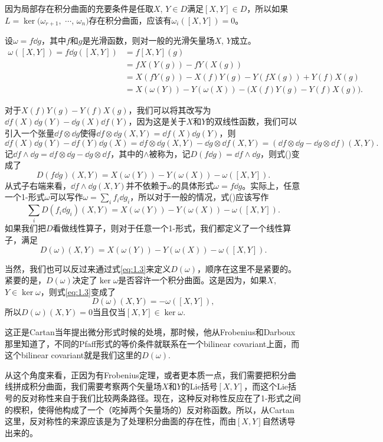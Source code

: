 因为局部存在积分曲面的充要条件是任取$X$, $Y\in D$满足$[X,Y]\in D$，所以如果$L=\ker(\omega_{r+1},$ $\cdots$, $\omega_n)$存在积分曲面，应该有$\omega_i([X,Y])=0$。

\para 设$\omega=f\dd g$，其中$f$和$g$是光滑函数，则对一般的光滑矢量场$X$, $Y$成立。
\begin{equation}
\begin{split}
	\omega([X,Y])=f\dd g([X,Y])&=f [X,Y](g)\\
	&=fX(Y(g))-fY(X(g))\\
	&=X(fY(g))-X(f)Y(g)-Y(fX(g))+Y(f)X(g)\\
	&=X(\omega(Y))-Y(\omega(X))-\bigl(X(f)Y(g)-Y(f)X(g)\bigr).
\end{split}
\end{equation}

对于$X(f)Y(g)-Y(f)X(g)$，我们可以将其改写为$\dd f(X)\dd g(Y)-\dd g(X)\dd f(Y)$，因为这是关于$X$和$Y$的双线性函数，我们可以引入一个张量$\dd f\otimes \dd g$使得$\dd f\otimes \dd g(X,Y)=\dd f(X)\dd g(Y)$，则
\[
	\dd f(X)\dd g(Y)-\dd f(Y)\dd g(X)=\dd f\otimes \dd g(X,Y)-\dd g\otimes \dd f(X,Y)=(\dd f\otimes \dd g-\dd g\otimes \dd f)(X,Y).
\]
记$\dd f\wedge \dd g=\dd f\otimes \dd g-\dd g\otimes \dd f$，其中的$\wedge$被称为，记$D(f\dd g)=\dd f\wedge \dd g$，则式(\theequation)变成了
\[
	D(f\dd g)(X,Y)=X(\omega(Y))-Y(\omega(X))-\omega([X,Y]).
\]
从式子右端来看，$\dd f\wedge \dd g(X,Y)$并不依赖于$\omega$的具体形式$\omega=f\dd g$。实际上，任意一个1-形式$\omega$可以写作$\omega=\sum_i f_i\dd g_i$，所以对于一般的情况，式(\theequation)应该写作
\[
	\sum_iD(f_i\dd g_i)(X,Y)=X(\omega(Y))-Y(\omega(X))-\omega([X,Y]).
\]
如果我们把$D$看做线性算子，则对于任意一个1-形式，我们都定义了一个线性算子，满足
\begin{equation}
	D(\omega)(X,Y)=X(\omega(Y))-Y(\omega(X))-\omega([X,Y]).
	\label{eq:1.3}
\end{equation}

\para 当然，我们也可以反过来通过式\eqref{eq:1.3}来定义$D(\omega)$，顺序在这里不是紧要的。紧要的是，$D(\omega)$决定了$\ker \omega$是否容许一个积分曲面。这是因为，如果$X$, $Y\in \ker \omega$，则式\eqref{eq:1.3}变成了
\[
	D(\omega)(X,Y)=-\omega([X,Y]),
\]
所以$D(\omega)(X,Y)=0$当且仅当$[X,Y]\in \ker \omega$.

这正是Cartan当年提出微分形式时候的处境，那时候，他从Frobenius和Darboux那里知道了，不同的Pfaff形式的等价条件就联系在一个bilinear covariant上面，而这个bilinear covariant就是我们这里的$D(\omega)$.

从这个角度来看，正因为有Frobenius定理，或者更本质一点，我们需要把积分曲线拼成积分曲面，我们需要考察两个矢量场$X$和$Y$的Lie括号$[X,Y]$，而这个Lie括号的反对称性来自于我们比较两条路径。现在，这种反对称性反应在了1-形式之间的楔积，使得他构成了一个（吃掉两个矢量场的）反对称函数。所以，从Cartan这里，反对称性的来源应该是为了处理积分曲面的存在性，而由$[X,Y]$自然诱导出来的。

